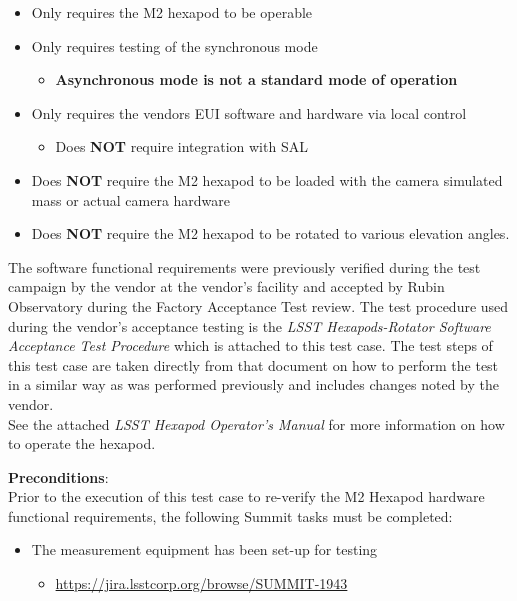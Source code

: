 \documentclass[SE,lsstdraft,STR,toc]{lsstdoc}
\providecommand{\tightlist}{
  \setlength{\itemsep}{0pt}\setlength{\parskip}{0pt}}
\begin{document}
\begin{itemize}
\tightlist
\item
  Only requires the M2 hexapod to be operable
\item
  Only requires testing of the synchronous mode

  \begin{itemize}
  \tightlist
  \item
    \textbf{Asynchronous mode is not a standard mode of operation}
  \end{itemize}
\item
  Only requires the vendors EUI software and hardware via local control

  \begin{itemize}
  \tightlist
  \item
    Does \textbf{NOT} require integration with SAL
  \end{itemize}
\item
  Does \textbf{NOT} require the M2 hexapod to be loaded with the camera
  simulated mass or actual camera hardware
\item
  Does \textbf{NOT} require the M2 hexapod to be rotated to various
  elevation angles.
\end{itemize}

The software functional requirements were previously verified during the
test campaign by the vendor at the vendor's facility and accepted by
Rubin Observatory during the Factory Acceptance Test review. The test
procedure used during the vendor's acceptance testing is the \emph{LSST
Hexapods-Rotator Software Acceptance Test Procedure} which is attached
to this test case. The test steps of this test case are taken directly
from that document on how to perform the test in a similar way as was
performed previously and includes changes noted by the
vendor.\\[2\baselineskip]See the attached \emph{LSST Hexapod Operator's
Manual} for more information on how to operate the hexapod.

\textbf{ Preconditions}:\\
Prior to the execution of this test case to re-verify the M2 Hexapod
hardware functional requirements, the following Summit tasks must be
completed:

\begin{itemize}
\tightlist
\item
  The measurement equipment has been set-up for testing

  \begin{itemize}
  \tightlist
  \item
    \url{https://jira.lsstcorp.org/browse/SUMMIT-1943}
  \end{itemize}
\end{itemize}
\end{document}
